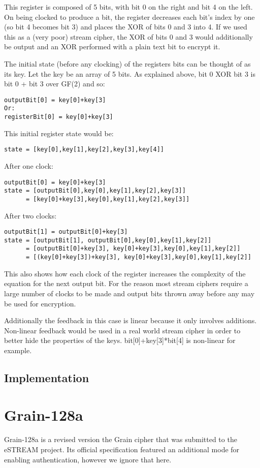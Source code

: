\documentclass{report}
\begin{document}
This register is composed of 5 bits, with bit 0 on the right and bit 4 on the left. On being clocked to produce a bit, the register decreases each bit's index by one (so bit 4 becomes bit 3) and places the XOR of bits 0 and 3 into 4. If we used this as a (very poor) stream cipher, the XOR of bits 0 and 3 would additionally be output and an XOR performed with a plain text bit to encrypt it.

The initial state (before any clocking) of the registers bits can be thought of as its key. Let the key be an array of 5 bits. As explained above, bit 0 XOR bit 3 is bit 0 + bit 3 over GF(2) and so:
\begin{verbatim}
outputBit[0] = key[0]+key[3]
Or:
registerBit[0] = key[0]+key[3]
\end{verbatim}
This initial register state would be:
\begin{verbatim}
state = [key[0],key[1],key[2],key[3],key[4]]
\end{verbatim}
After one clock:
\begin{verbatim}
outputBit[0] = key[0]+key[3]
state = [outputBit[0],key[0],key[1],key[2],key[3]]
      = [key[0]+key[3],key[0],key[1],key[2],key[3]]
\end{verbatim}
After two clocks:
\begin{verbatim}
outputBit[1] = outputBit[0]+key[3]
state = [outputBit[1], outputBit[0],key[0],key[1],key[2]]
      = [outputBit[0]+key[3], key[0]+key[3],key[0],key[1],key[2]]
      = [(key[0]+key[3])+key[3], key[0]+key[3],key[0],key[1],key[2]]
\end{verbatim}
This also shows how each clock of the register increases the complexity of the equation for the next output bit. For the reason most stream ciphers require a large number of clocks to be made and output bits thrown away before any may be used for encryption.

Additionally the feedback in this case is linear because it only involves additions. Non-linear feedback would be used in a real world stream cipher in order to better hide the properties of the keys. bit[0]+key[3]*bit[4] is non-linear for example.
\subsection{Implementation}
\section{Grain-128a}
Grain-128a\cite{Grain128aSpec} is a revised version the Grain cipher that was submitted to the eSTREAM project. Its official specification featured an additional mode for enabling authentication, however we ignore that here.
\end{document}
